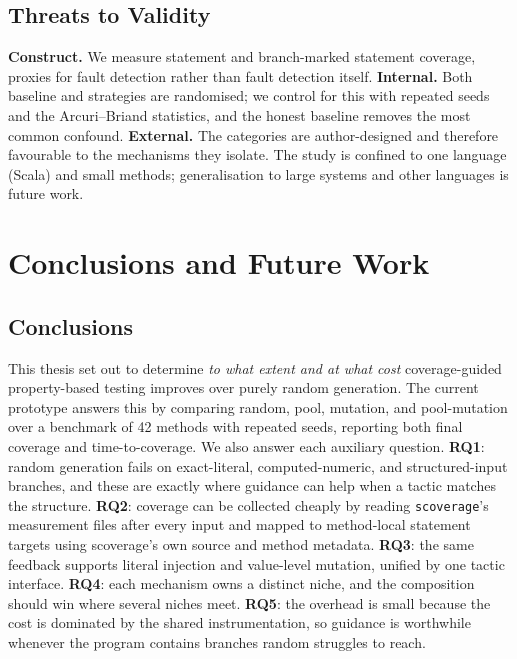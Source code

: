 \documentclass[11pt,a4paper]{report}
\begin{document}
\section{Threats to Validity}
\label{sec:threats}

\textbf{Construct.} We measure statement and branch-marked statement coverage, proxies for fault detection
rather than fault detection itself. \textbf{Internal.} Both baseline and strategies are randomised; we control
for this with repeated seeds and the Arcuri--Briand statistics, and the honest baseline removes the most common
confound. \textbf{External.} The categories are author-designed and therefore favourable to the mechanisms they
isolate. The study is confined to one language (Scala) and small methods; generalisation to large systems and
other languages is future work.

\chapter{Conclusions and Future Work}
\label{ch:conclusions}

\section{Conclusions}

This thesis set out to determine \emph{to what extent and at what cost} coverage-guided property-based testing
improves over purely random generation. The current prototype answers this by comparing random, pool,
mutation, and pool-mutation over a benchmark of 42 methods with repeated seeds, reporting both final coverage
and time-to-coverage. We also answer each auxiliary question. \textbf{RQ1}: random generation fails on
exact-literal, computed-numeric, and structured-input branches, and these are exactly where guidance can help
when a tactic matches the structure. \textbf{RQ2}: coverage can be collected cheaply by reading
\texttt{scoverage}'s measurement files after every input and mapped to method-local statement targets using
scoverage's own source and method metadata. \textbf{RQ3}: the same feedback supports literal injection and
value-level mutation, unified by one tactic interface. \textbf{RQ4}: each mechanism owns a distinct niche, and
the composition should win where several niches meet.
\textbf{RQ5}: the overhead is small because the cost is dominated by the shared instrumentation, so guidance
is worthwhile whenever the program contains branches random struggles to reach.
\end{document}

